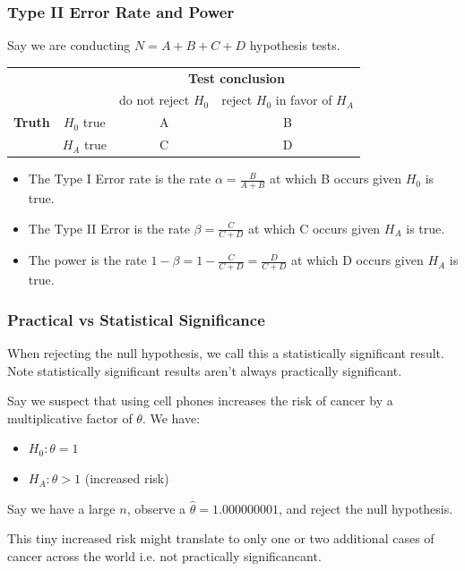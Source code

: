 \documentclass[handout]{beamer}
\newcommand{\blue}[1]{\textcolor{blue2}{#1}}
\begin{document}
\begin{frame}
\frametitle{Type II Error Rate and Power}
Say we are conducting $N=A+B+C+D$ hypothesis tests.
\begin{center}
  \begin{tabular}{cc|cc}
     \multicolumn{2}{c}{}  & \multicolumn{2}{c}{\textbf{Test conclusion}} \\ 
     &  & do not reject $H_0$ & reject $H_0$ in favor of $H_A$ \\ 
\hline
    \textbf{Truth} & $H_0$ true & A & B \\ 
     & $H_A$ true & C & D \\ 
    \hline
  \end{tabular}
\end{center}

\vspace{0.25cm}

\begin{itemize}
\pause \item The \blue{Type I Error rate} is the rate $\alpha = \frac{B}{A+B}$ at which B occurs \blue{given $H_0$ is true}.
\pause \item The \blue{Type II Error} is the rate $\beta = \frac{C}{C+D}$ at which 
C occurs \blue{given $H_A$ is true}.
\pause \item The \blue{power} is the rate $1-\beta = 1-\frac{C}{C+D} = \frac{D}{C+D}$ at which D occurs \blue{given $H_A$ is true}.
\end{itemize}

\end{frame}






\begin{frame}
\frametitle{Practical vs Statistical Significance}
When rejecting the null hypothesis, we call this a \blue{statistically significant} result.  Note statistically significant results aren't always practically significant.  

\pause\vspace{0.5cm}

Say we suspect that using cell phones increases the risk of cancer by a multiplicative factor of $\theta$.  We have:
\begin{itemize}
\item $H_0: \theta=1$
\item $H_A: \theta>1$ (increased risk)
\end{itemize}
\pause Say we have a large $n$, observe a $\widehat{\theta}=1.000000001$, and reject the null hypothesis.  

\pause\vspace{0.5cm}

This tiny increased risk might translate to only one or two additional cases of cancer across the world i.e. not practically significancant.  
\end{frame}
\end{document}
